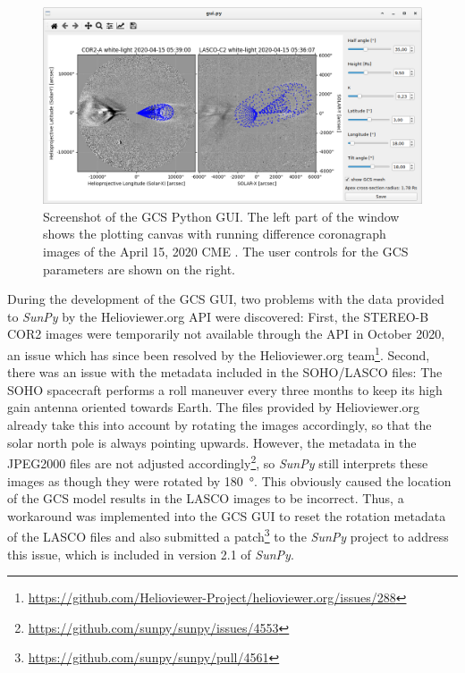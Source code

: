 \begin{figure}
	\centering
	\includegraphics[width=\textwidth]{images/gcs_screenshot.png}
	\caption[Screenshot of the \acs{GCS} Python \acs{GUI}]{Screenshot of the \ac{GCS} Python \ac{GUI}. The left part of the window shows the plotting canvas with running difference coronagraph images of the April 15, 2020 \ac{CME} \citep[see][]{Forstner-2021-SolO}. The user controls for the \ac{GCS} parameters are shown on the right.}
	\label{fig:gcs_screenshot}
\end{figure}

During the development of the \ac{GCS} \ac{GUI}, two problems with the data provided to \textit{SunPy} by the Helioviewer.org \ac{API} were discovered: First, the \ac{STEREO}-B COR2 images were temporarily not available through the \ac{API} in October 2020, an issue which has since been resolved by the Helioviewer.org team\footnote{\url{https://github.com/Helioviewer-Project/helioviewer.org/issues/288}}. Second, there was an issue with the metadata included in the \ac{SOHO}/LASCO files: The \ac{SOHO} spacecraft performs a roll maneuver every three months to keep its high gain antenna oriented towards Earth. The files provided by Helioviewer.org already take this into account by rotating the images accordingly, so that the solar north pole is always pointing upwards. However, the metadata in the JPEG2000 files are not adjusted accordingly\footnote{\url{https://github.com/sunpy/sunpy/issues/4553}}, so \textit{SunPy} still interprets these images as though they were rotated by \SI{180}{\degree}. This obviously caused the location of the \ac{GCS} model results in the LASCO images to be incorrect. Thus, a workaround was implemented into the \ac{GCS} \ac{GUI} to reset the rotation metadata of the LASCO files and also submitted a patch\footnote{\url{https://github.com/sunpy/sunpy/pull/4561}} to the \textit{SunPy} project to address this issue, which is included in version 2.1 of \textit{SunPy}.

